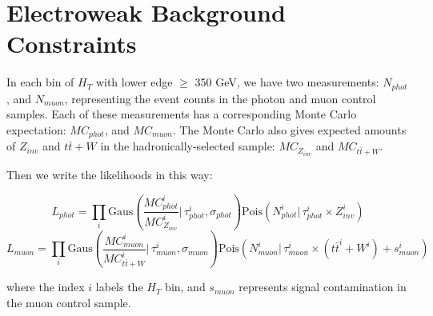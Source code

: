 \section{Electroweak Background Constraints}
In each bin of $H_T$ with lower edge $\ge$ 350 GeV, we have two measurements: $N_{phot}$, and $N_{muon}$,
representing the event counts in the photon and muon control samples.  Each of these measurements has a 
corresponding Monte Carlo expectation: $MC_{phot}$, and $MC_{muon}$.  The Monte Carlo also gives
expected amounts of $Z_{inv}$ and $t\bar{t}+W$ in the hadronically-selected sample: $MC_{Z_{inv}}$ and $MC_{t\bar{t}+W}$.

Then we write the likelihoods in this way:

\begin{equation}
L_{phot}=\prod_i \mathrm{Gaus}( \frac{MC_{phot}^i}{MC_{Z_{inv}}^i}    |\,\tau_{phot}^i, \sigma_{phot}) \mathrm{Pois}(N_{phot}^i |\, \tau_{phot}^{i}\times Z_{inv}^{i})
\end{equation}
\begin{equation}
L_{muon}=\prod_i \mathrm{Gaus}( \frac{MC_{muon}^i}{MC_{t\bar{t}+W}^i} |\,\tau_{muon}^i, \sigma_{muon}) \mathrm{Pois}(N_{muon}^i |\, \tau_{muon}^{i}\times(t\bar{t}^i+W^i) + s_{muon}^i)
\end{equation}

where the index $i$ labels the $H_T$ bin, and $s_{muon}$ represents signal contamination in the muon control sample.

